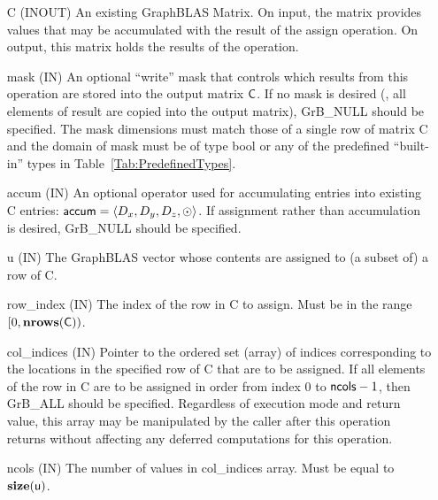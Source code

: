 \begin{itemize}[leftmargin=1.1in]
    \item[{\sf C}]    ({\sf INOUT}) An existing GraphBLAS Matrix.  On input,
    the matrix provides values that may be accumulated with the result of the
    assign operation.  On output, this matrix holds the results of the
    operation.

    \item[{\sf mask}]  ({\sf IN}) An optional ``write'' mask that controls which
    results from this operation are stored into the output matrix
    ${\sf C}$.  If no mask is desired (\ie, all elements
    of result are copied into the output matrix), {\sf GrB\_NULL}
    should be specified. The mask dimensions must match those of a single row
    of matrix {\sf C} and the domain of {\sf mask} must be
    of type {\sf bool} or any of the predefined ``built-in'' types in
    Table~\ref{Tab:PredefinedTypes}.
    
    \item[{\sf accum}]    ({\sf IN}) An optional operator used for accumulating
    entries into existing {\sf C} entries: ${\sf accum} = \langle D_x,
    D_y, D_z,\odot \rangle$. If assignment rather than accumulation is
    desired, {\sf GrB\_NULL} should be specified.

    \item[{\sf u}]       ({\sf IN}) The GraphBLAS vector whose contents are 
    assigned to (a subset of) a row of {\sf C}.

    \item[{\sf row\_index}]  ({\sf IN}) The index of the row in {\sf C} to 
    assign. Must be in the range $[0, \bold{nrows}({\sf C}))$.

    \item[{\sf col\_indices}]  ({\sf IN}) Pointer to the ordered set (array) of 
    indices corresponding to the locations in the specified row of {\sf C} 
    that are to be assigned.  If all elements of the row in {\sf C} are to be 
    assigned in order from index $0$ to ${\sf ncols} - 1$, then {\sf GrB\_ALL} should be 
    specified.  Regardless of execution mode and return value, this array may be
    manipulated by the caller after this operation returns without affecting any 
    deferred computations for this operation.
    
    \item[{\sf ncols}] ({\sf IN}) The number of values in {\sf col\_indices} array.
    Must be equal to $\bold{size}({\sf u})$.
    

\end{itemize}
